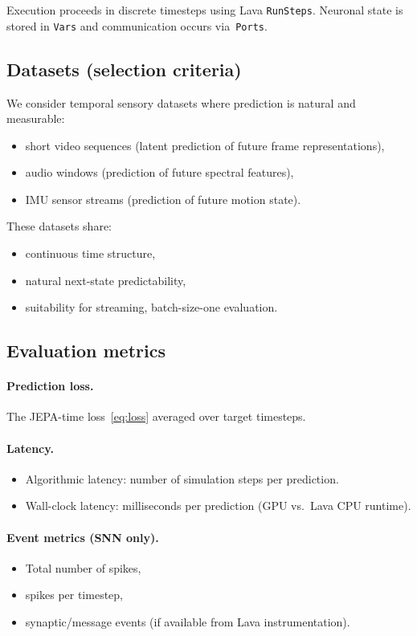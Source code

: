 \documentclass[11pt,a4paper]{article}
\begin{document}
Execution proceeds in discrete timesteps using Lava \texttt{RunSteps}.
Neuronal state is stored in \texttt{Vars} and communication occurs
via~\texttt{Ports}.

\subsection{Datasets (selection criteria)}

We consider temporal sensory datasets where prediction is natural and
measurable:

\begin{itemize}[nosep]
\item short video sequences (latent prediction of future frame
  representations),
\item audio windows (prediction of future spectral features),
\item IMU sensor streams (prediction of future motion state).
\end{itemize}

These datasets share:
\begin{itemize}[nosep]
\item continuous time structure,
\item natural next-state predictability,
\item suitability for streaming, batch-size-one evaluation.
\end{itemize}

\subsection{Evaluation metrics}

\paragraph{Prediction loss.}
The JEPA-time loss~\eqref{eq:loss} averaged over target timesteps.

\paragraph{Latency.}
\begin{itemize}[nosep]
\item Algorithmic latency: number of simulation steps per prediction.
\item Wall-clock latency: milliseconds per prediction (GPU vs.\ Lava CPU
  runtime).
\end{itemize}

\paragraph{Event metrics (SNN only).}
\begin{itemize}[nosep]
\item Total number of spikes,
\item spikes per timestep,
\item synaptic/message events (if available from Lava instrumentation).
\end{itemize}
\end{document}
